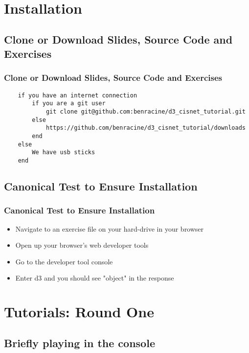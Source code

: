 \documentclass{beamer}
\begin{document}
\section{Installation}

\subsection{Clone or Download Slides, Source Code and Exercises}

\begin{frame}[fragile]
    \frametitle{Clone or Download Slides, Source Code and Exercises}
        \tiny{
        \begin{verbatim}
    if you have an internet connection
        if you are a git user
            git clone git@github.com:benracine/d3_cisnet_tutorial.git
        else
            https://github.com/benracine/d3_cisnet_tutorial/downloads
        end
    else
        We have usb sticks
    end
        \end{verbatim}
        }
\end{frame}



\subsection{Canonical Test to Ensure Installation}

\begin{frame}
    \frametitle{Canonical Test to Ensure Installation}
    \begin{itemize}
\pause
    \item Navigate to an exercise file on your hard-drive in your browser
\pause
    \item Open up your browser's web developer tools
\pause
    \item Go to the developer tool console
\pause
    \item Enter d3 and you should see "object" in the response
\pause
    \end{itemize}
\end{frame}




\section{Tutorials: Round One}

\subsection{Briefly playing in the console}
\end{document}
